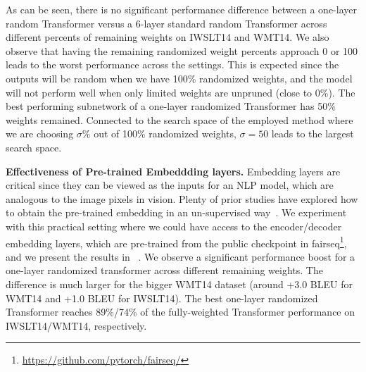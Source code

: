 As can be seen, there is no significant performance difference between a one-layer random Transformer versus a 6-layer standard random Transformer across different percents of remaining weights on IWSLT14 and WMT14. 
We also observe that having the remaining randomized weight percents approach 0 or 100 leads to the worst performance across the settings. 
This is expected since the outputs will be random when we have 100\% randomized weights, and the model will not perform well when only limited weights are unpruned (close to 0\%). 
The best performing subnetwork of a one-layer randomized Transformer has 50\% weights remained. 
Connected to the search space of the employed method where we are choosing $\sigma$\% out of 100\% randomized weights, $\sigma=50$ leads to the largest search space. 



\noindent\textbf{Effectiveness of Pre-trained Embeddding layers.}
Embedding layers are critical since they can be viewed as the inputs for an NLP model, which are analogous to the image pixels in vision. 
Plenty of prior studies have explored how to obtain the pre-trained embedding in an un-supervised way~\citep{mikolov2013efficient,pennington-etal-2014-glove}. 
We experiment with this practical setting where we could have access to the encoder/decoder embedding layers, which are pre-trained from the public checkpoint in fairseq\footnote{\href{https://github.com/pytorch/fairseq/}{https://github.com/pytorch/fairseq/}}, and we present the results in ~. 
We observe a significant performance boost for a one-layer randomized transformer across different remaining weights. 
The difference is much larger for the bigger WMT14 dataset (around +3.0 BLEU for WMT14 and +1.0 BLEU for IWSLT14). 
The best one-layer randomized Transformer reaches 89\%/74\% of the fully-weighted Transformer performance on IWSLT14/WMT14, respectively.  


